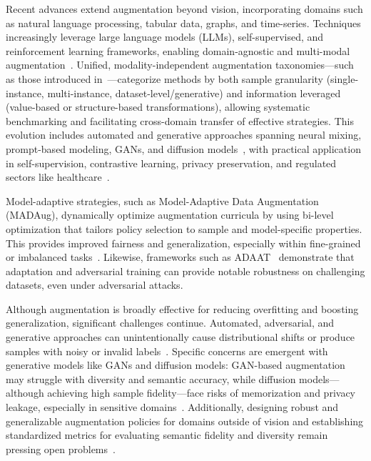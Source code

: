 \documentclass[sigconf]{acmart}
\begin{document}
Recent advances extend augmentation beyond vision, incorporating domains such as natural language processing, tabular data, graphs, and time-series. Techniques increasingly leverage large language models (LLMs), self-supervised, and reinforcement learning frameworks, enabling domain-agnostic and multi-modal augmentation~\cite{ref1,ref2,ref3,ref5,ref6,ref10,ref12,ref13,ref14,ref15,ref16,ref18,ref21,ref22,ref23,ref24,ref25,ref26,ref29,ref30,ref32,ref60,ref62,ref64,ref65,ref70,ref83}. Unified, modality-independent augmentation taxonomies---such as those introduced in~\cite{ref64}---categorize methods by both sample granularity (single-instance, multi-instance, dataset-level/generative) and information leveraged (value-based or structure-based transformations), allowing systematic benchmarking and facilitating cross-domain transfer of effective strategies. This evolution includes automated and generative approaches spanning neural mixing, prompt-based modeling, GANs, and diffusion models~\cite{ref6,ref18,ref22,ref24,ref26,ref64}, with practical application in self-supervision, contrastive learning, privacy preservation, and regulated sectors like healthcare~\cite{ref1,ref2,ref3,ref12,ref13,ref21,ref60}.

Model-adaptive strategies, such as Model-Adaptive Data Augmentation (MADAug), dynamically optimize augmentation curricula by using bi-level optimization that tailors policy selection to sample and model-specific properties. This provides improved fairness and generalization, especially within fine-grained or imbalanced tasks~\cite{ref66}. Likewise, frameworks such as ADAAT~\cite{ref85} demonstrate that adaptation and adversarial training can provide notable robustness on challenging datasets, even under adversarial attacks.

Although augmentation is broadly effective for reducing overfitting and boosting generalization, significant challenges continue. Automated, adversarial, and generative approaches can unintentionally cause distributional shifts or produce samples with noisy or invalid labels~\cite{ref61,ref62,ref64,ref85}. Specific concerns are emergent with generative models like GANs and diffusion models: GAN-based augmentation may struggle with diversity and semantic accuracy, while diffusion models—although achieving high sample fidelity—face risks of memorization and privacy leakage, especially in sensitive domains~\cite{ref21,ref24,ref26}. Additionally, designing robust and generalizable augmentation policies for domains outside of vision and establishing standardized metrics for evaluating semantic fidelity and diversity remain pressing open problems~\cite{ref5,ref12,ref62,ref64,ref65}. 
\end{document}

